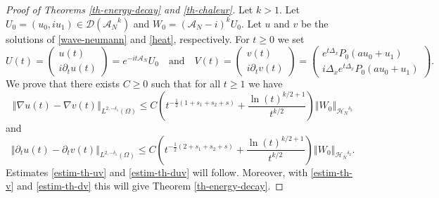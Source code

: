 \documentclass[10pt, a4paper,reqno]{amsart}
\theoremstyle{plain}
\theoremstyle{definition}
\theoremstyle{remark}
\begin{document}
\begin{proof}[Proof of Theorems \ref{th-energy-decay} and \ref{th-chaleur}]

Let $k > 1$. Let $U_0 = (u_0,iu_1) \in {{\mathcal D}}({{{\mathcal A}}_N}^k)$ and $W_0 = ({{{\mathcal A}}_N}-i)^k U_0$. Let $u$ and $v$ be the solutions of \eqref{wave-neumann} and \eqref{heat}, respectively. For $t {\geqslant} 0$ we set
\[
U(t) = \begin{pmatrix} u(t) \\ i\partial_t u(t) \end{pmatrix} = e^{-it{{{\mathcal A}}_N}} U_0 \quad \text{and} \quad V(t) = \begin{pmatrix} v(t) \\ i\partial_t v(t) \end{pmatrix} = \begin{pmatrix} e^{t{{\Delta}_x} } P_0 (au_0+u_1) \\ i {{\Delta}_x}   e^{t{{\Delta}_x} } P_0 (au_0+u_1) \end{pmatrix}.
\]
We prove that there exists $C {\geqslant} 0$ such that for all $t {\geqslant} 1$ we have 
\begin{equation} \label{estim-UV1}
{\left\Vert {\nabla u(t) - \nabla v(t)}\right\Vert}_{L^{2,-{\delta}_1}({\Omega})} {\leqslant} C \left( t^{-\frac 12 (1 +s_1 +s_2 + s)} + \frac {\ln(t)^{k/2+1}} {t^{k/2}} \right) {\left\Vert {W_0}\right\Vert}_{{\mathcal H_N}^{{\delta}_2}}
\end{equation}
and
\begin{equation} \label{estim-UV2}
{\left\Vert {\partial_t u(t) - \partial_t v(t)}\right\Vert}_{L^{2,-{\delta}_1}({\Omega})} {\leqslant} C \left( t^{-\frac 12 (2 +s_1 +s_2 + s)} + \frac {\ln(t)^{k/2+1}} {t^{k/2}} \right) {\left\Vert {W_0}\right\Vert}_{{\mathcal H_N}^{{\delta}_2}}.
\end{equation}
Estimates \eqref{estim-th-uv} and \eqref{estim-th-duv} will follow. Moreover, with \eqref{estim-th-v} and \eqref{estim-th-dv} this will give Theorem \ref{th-energy-decay}.


\end{proof}
\end{document}
